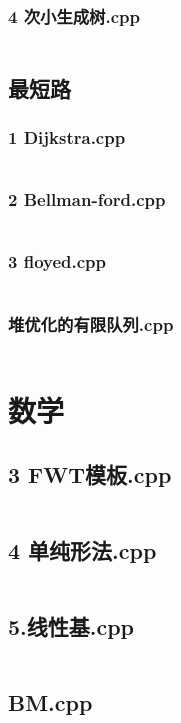 \documentclass[a4paper,11pt]{article}
\begin{document}
\subsubsection{4 次小生成树.cpp}
\inputminted[breaklines]{c++}{"D:/tmplz/templates/图论/最小生成树/4 次小生成树.cpp"}
\subsection{最短路}
\subsubsection{1 Dijkstra.cpp}
\inputminted[breaklines]{c++}{"D:/tmplz/templates/图论/最短路/1 Dijkstra.cpp"}
\subsubsection{2 Bellman-ford.cpp}
\inputminted[breaklines]{c++}{"D:/tmplz/templates/图论/最短路/2 Bellman-ford.cpp"}
\subsubsection{3 floyed.cpp}
\inputminted[breaklines]{c++}{"D:/tmplz/templates/图论/最短路/3 floyed.cpp"}
\subsubsection{堆优化的有限队列.cpp}
\inputminted[breaklines]{c++}{"D:/tmplz/templates/图论/最短路/堆优化的有限队列.cpp"}
\section{数学}
\subsection{3 FWT模板.cpp}
\inputminted[breaklines]{c++}{"D:/tmplz/templates/数学/3 FWT模板.cpp"}
\subsection{4 单纯形法.cpp}
\inputminted[breaklines]{c++}{"D:/tmplz/templates/数学/4 单纯形法.cpp"}
\subsection{5.线性基.cpp}
\inputminted[breaklines]{c++}{"D:/tmplz/templates/数学/5.线性基.cpp"}
\subsection{BM.cpp}
\inputminted[breaklines]{c++}{"D:/tmplz/templates/数学/BM.cpp"}
\end{document}
